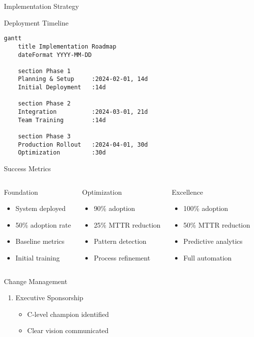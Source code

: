 \documentclass[presentation,aspectratio=169]{beamer}
\begin{document}
\begin{frame}[label={sec:org7f9d670},fragile]{Implementation Strategy}
 \begin{block}{Deployment Timeline}
\begin{verbatim}
gantt
    title Implementation Roadmap
    dateFormat YYYY-MM-DD

    section Phase 1
    Planning & Setup     :2024-02-01, 14d
    Initial Deployment   :14d

    section Phase 2
    Integration          :2024-03-01, 21d
    Team Training        :14d

    section Phase 3
    Production Rollout   :2024-04-01, 30d
    Optimization         :30d
\end{verbatim}
\end{block}
\begin{block}{Success Metrics}
\begin{columns}
\begin{column}{0.33\columnwidth}
\alert{Foundation}
\begin{itemize}
\item System deployed
\item 50\% adoption rate
\item Baseline metrics
\item Initial training
\end{itemize}
\end{column}
\begin{column}{0.33\columnwidth}
\alert{Optimization}
\begin{itemize}
\item 90\% adoption
\item 25\% MTTR reduction
\item Pattern detection
\item Process refinement
\end{itemize}
\end{column}
\begin{column}{0.34\columnwidth}
\alert{Excellence}
\begin{itemize}
\item 100\% adoption
\item 50\% MTTR reduction
\item Predictive analytics
\item Full automation
\end{itemize}
\end{column}
\end{columns}
\end{block}
\begin{block}{Change Management}
\begin{enumerate}[<+->]
\item \alert{Executive Sponsorship}
\begin{itemize}
\item C-level champion identified
\item Clear vision communicated
\end{itemize}


\end{enumerate}
\end{block}
\end{frame}
\end{document}
